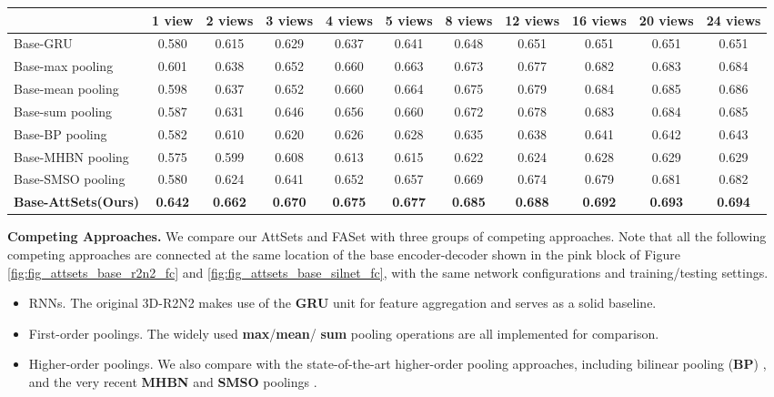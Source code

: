 \documentclass[twocolumn]{svjour3}    \pdfoutput=1
\newcommand{\nickname}{AttSets}
\newcommand{\faset}{FASet}
\newcommand{\ie}{\textit{i}.\textit{e}., }
\begin{document}
\begin{table*}[t]
\caption{Group 5: mean IoU for multi-view reconstruction of all 13 categories in ShapeNet testing split. All networks are firstly trained given only 1 image for each object in Stage 1. The \nickname{} module is further trained given random number of images per object in Stage 2, \ie  is uniformly sampled from \textbf{[1, 24]}, while other competing approaches are fine-tuned given random number of views per object in Stage 2.}
\centering
\label{tab:iou_r2n2_allv}
\tabcolsep=0.125cm
\begin{tabular}{ l|cccccccccc}
\hline
&1 view&2 views&3 views& 4 views&5 views&8 views&12 views&16 views&20 views&24 views \\
\hline
Base-GRU &0.580&0.615&0.629&0.637&0.641&0.648&0.651&0.651&0.651&0.651 \\
Base-max pooling &0.601&0.638&0.652&0.660&0.663&0.673&0.677&0.682&0.683&0.684 \\
Base-mean pooling &0.598&0.637&0.652&0.660&0.664&0.675&0.679&0.684&0.685&0.686 \\
Base-sum pooling &0.587&0.631&0.646&0.656&0.660&0.672&0.678&0.683&0.684&0.685 \\
Base-BP pooling &0.582&0.610&0.620&0.626&0.628&0.635&0.638&0.641&0.642&0.643 \\
Base-MHBN pooling &0.575&0.599&0.608&0.613&0.615&0.622&0.624&0.628&0.629&0.629 \\
Base-SMSO pooling &0.580&0.624&0.641&0.652&0.657&0.669&0.674&0.679&0.681&0.682 \\
\textbf{Base-\nickname{}(Ours)} &\textbf{0.642}&\textbf{0.662}&\textbf{0.670}&\textbf{0.675}&\textbf{0.677}&\textbf{0.685}
&\textbf{0.688}&\textbf{0.692}&\textbf{0.693}&\textbf{0.694} \\
\hline
\end{tabular}
\vspace{-0.1 cm}
\end{table*}

\textbf{Competing Approaches.} We compare our \nickname{} and \faset{} with three groups of competing approaches. Note that all the following competing approaches are connected at the same location of the base encoder-decoder shown in the pink block of Figure \ref{fig:fig_attsets_base_r2n2_fc} and \ref{fig:fig_attsets_base_silnet_fc}, with the same network configurations and training/testing settings.

\begin{itemize}[leftmargin=0.3cm]
\item RNNs. The original 3D-R2N2 makes use of the \textbf{GRU} \citep{Chan2016,Kar2017} unit for feature aggregation and serves as a solid baseline.
\item First-order poolings. The widely used \textbf{max}/\textbf{mean}/ \textbf{sum} pooling operations \citep{Huang2018,Paschalidou2018,Eslami2018} are all implemented for comparison.
\item Higher-order poolings. We also compare with the state-of-the-art higher-order pooling approaches, including bilinear pooling (\textbf{BP}) \citep{Lin2015}, and the very recent \textbf{MHBN} \citep{Yu2018a} and \textbf{SMSO} poolings \citep{Yu2018b}. 
\end{itemize}
\end{document}
